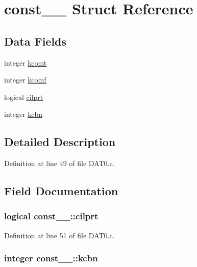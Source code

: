 \hypertarget{structconst__1__}{}\section{const\+\_\+\_\+ Struct Reference}
\label{structconst__1__}
\subsection*{Data Fields}
\begin{DoxyCompactItemize}
\item 
integer \hyperlink{structconst__1___a3b1014e7a63e0bfc2611e1822cc48d5b}{kcomt}
\item 
integer \hyperlink{structconst__1___aa9c884ca4361b4189dfa11704145fac2}{kcomf}
\item 
logical \hyperlink{structconst__1___a387e325f8ec2a24ffe5cfa3e4ec56623}{cilprt}
\item 
integer \hyperlink{structconst__1___ab54132bd005c4448814b87695d85ccea}{kcbn}
\end{DoxyCompactItemize}


\subsection{Detailed Description}


Definition at line 49 of file D\+A\+T0.\+c.



\subsection{Field Documentation}
\subsubsection[{\texorpdfstring{cilprt}{cilprt}}]{\setlength{\rightskip}{0pt plus 5cm}logical const\+\_\+\_\+\+::cilprt}\hypertarget{structconst__1___a387e325f8ec2a24ffe5cfa3e4ec56623}{}\label{structconst__1___a387e325f8ec2a24ffe5cfa3e4ec56623}


Definition at line 51 of file D\+A\+T0.\+c.

\subsubsection[{\texorpdfstring{kcbn}{kcbn}}]{\setlength{\rightskip}{0pt plus 5cm}integer const\+\_\+\_\+\+::kcbn}\hypertarget{structconst__1___ab54132bd005c4448814b87695d85ccea}{}\label{structconst__1___ab54132bd005c4448814b87695d85ccea}


